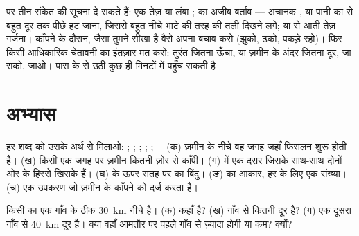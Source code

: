 \begin{remark}[समुद्र की दी हुई चेतावनी]\label{rem:g7:earthquakes:natural-warning}
 पर तीन संकेत  की सूचना दे सकते हैं: एक तेज़ या लंबा ;  का
अजीब बर्ताव --- अचानक , या पानी का  से बहुत दूर तक पीछे हट जाना, जिससे
बहुत नीचे भाटे की तरह  की तली दिखने लगे; या  से आती तेज़ गर्जना।
काँपने के दौरान, जैसा तुमने सीखा है वैसे अपना बचाव करो (झुको, ढको, पकड़े रहो)।
फिर किसी आधिकारिक चेतावनी का इंतज़ार मत करो: तुरंत जितना ऊँचा, या ज़मीन के अंदर
जितना दूर, जा सको, जाओ। पास के  से उठी  कुछ ही मिनटों में
पहुँच सकती है।
\end{remark}


\section{अभ्यास}

\begin{exercise}[$\star$]\label{exo:g7:earthquakes:1}
हर शब्द को उसके अर्थ से मिलाओ: ; ; ; ; ;
। (क) ज़मीन के नीचे वह जगह जहाँ फिसलन शुरू होती है। (ख) किसी एक जगह पर
ज़मीन कितनी ज़ोर से काँपी। (ग)  में एक दरार जिसके साथ-साथ दोनों ओर के
हिस्से खिसके हैं। (घ)  के ऊपर सतह पर का बिंदु। (ङ)  का आकार, हर
 के लिए एक संख्या। (च) एक उपकरण जो ज़मीन के काँपने को दर्ज
करता है।
\end{exercise}

\begin{exercise}[$\star$]\label{exo:g7:earthquakes:2}
किसी  का  एक गाँव के ठीक \qty{30}{km} नीचे है।
(क)  कहाँ है? (ख) गाँव  से कितनी दूर है? (ग) एक दूसरा गाँव
 से \qty{40}{km} दूर है। क्या वहाँ  आमतौर पर पहले गाँव से ज़्यादा
होगी या कम? क्यों?
\end{exercise}

